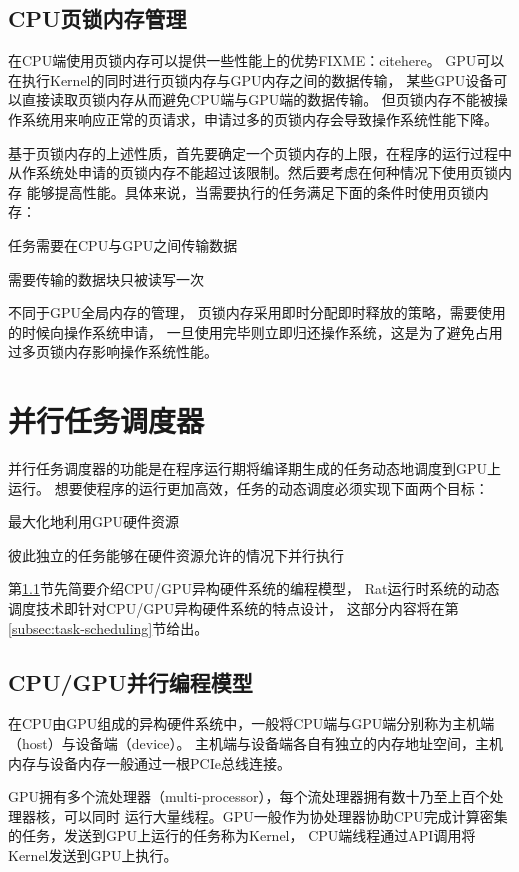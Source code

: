 \subsection{CPU页锁内存管理}
在CPU端使用页锁内存可以提供一些性能上的优势FIXME：citehere。
GPU可以在执行Kernel的同时进行页锁内存与GPU内存之间的数据传输，
某些GPU设备可以直接读取页锁内存从而避免CPU端与GPU端的数据传输。
但页锁内存不能被操作系统用来响应正常的页请求，申请过多的页锁内存会导致操作系统性能下降。

基于页锁内存的上述性质，首先要确定一个页锁内存的上限，在程序的运行过程中
从作系统处申请的页锁内存不能超过该限制。然后要考虑在何种情况下使用页锁内存
能够提高性能。具体来说，当需要执行的任务满足下面的条件时使用页锁内存：
\begin{compactitem}
  \item 任务需要在CPU与GPU之间传输数据
  \item 需要传输的数据块只被读写一次
\end{compactitem}

不同于GPU全局内存的管理，
页锁内存采用即时分配即时释放的策略，需要使用的时候向操作系统申请，
一旦使用完毕则立即归还操作系统，这是为了避免占用过多页锁内存影响操作系统性能。

\section{并行任务调度器}\label{sec:task-scheduler}
并行任务调度器的功能是在程序运行期将编译期生成的任务动态地调度到GPU上运行。
想要使程序的运行更加高效，任务的动态调度必须实现下面两个目标：
\begin{compactitem}
  \item 最大化地利用GPU硬件资源
  \item 彼此独立的任务能够在硬件资源允许的情况下并行执行
\end{compactitem}

第\ref{cpu-gpu-model}节先简要介绍CPU/GPU异构硬件系统的编程模型，
Rat运行时系统的动态调度技术即针对CPU/GPU异构硬件系统的特点设计，
这部分内容将在第\ref{subsec:task-scheduling}节给出。

\subsection{CPU/GPU并行编程模型}\label{cpu-gpu-model}
在CPU由GPU组成的异构硬件系统中，一般将CPU端与GPU端分别称为主机端（host）与设备端（device）。
主机端与设备端各自有独立的内存地址空间，主机内存与设备内存一般通过一根PCIe总线连接。

GPU拥有多个流处理器（multi-processor），每个流处理器拥有数十乃至上百个处理器核，可以同时
运行大量线程。GPU一般作为协处理器协助CPU完成计算密集的任务，发送到GPU上运行的任务称为Kernel，
CPU端线程通过API调用将Kernel发送到GPU上执行。

